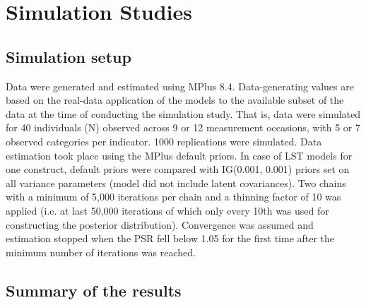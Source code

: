 \section{Simulation Studies}

\subsection{Simulation setup}

Data were generated and estimated using MPlus 8.4. Data-generating values are based on the real-data application of the models to the available subset of the data at the time of conducting the simulation study. That is, data were simulated for 40 individuals (N) observed across 9 or 12 measurement occasions, with 5 or 7 observed categories per indicator. 1000 replications were simulated. Data estimation took place using the MPlus default priors. In case of   LST models for one construct, default priors were compared with IG(0.001, 0.001) priors set on all variance parameters (model did not include latent covariances). Two chains with a minimum of 5,000 iterations per chain and a thinning factor of 10 was applied (i.e. at last 50,000 iterations of which only every 10th was used for constructing the posterior distribution). Convergence was assumed and estimation stopped when the PSR fell below 1.05 for the first time after the minimum number of iterations was reached.

\subsection{Summary of the results}

